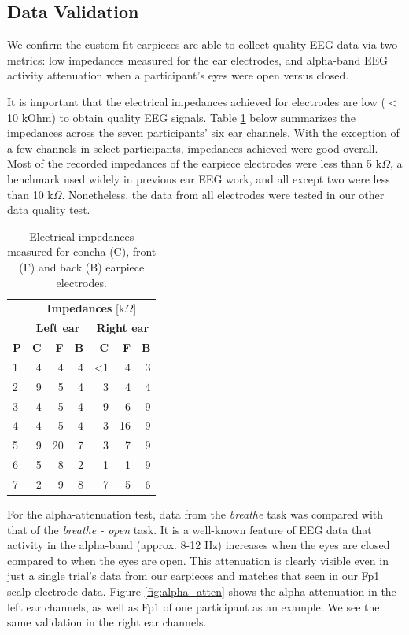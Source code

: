 \documentclass{sigchi}
\begin{document}
\subsection{Data Validation}

We confirm the custom-fit earpieces are able to collect quality EEG data via two metrics: low impedances measured for the ear electrodes, and alpha-band EEG activity attenuation when a participant's eyes were open versus closed.

It is important that the electrical impedances achieved for electrodes are low ($<$10 kOhm) to obtain quality EEG signals. Table \ref{tab:impedances} below summarizes the impedances across the seven participants' six ear channels. With the exception of a few channels in select participants, impedances achieved were good overall. Most of the recorded impedances of the earpiece electrodes were less than 5 k\(\Omega\), a benchmark used widely in previous ear EEG work, and all except two were less than 10 k\(\Omega\). Nonetheless, the data from all electrodes were tested in our other data quality test.

\begin{table}[h]
\begin{center}
\begin{tabular}{lrrrrrr}
& \multicolumn{6}{c}{\textbf{Impedances} [k\(\Omega\)]} \\
\cline{2-7}
& \multicolumn{3}{|c|}{\textbf{Left ear}} & \multicolumn{3}{c|}{\textbf{Right ear}} \\
\textbf{P} & \textbf{C} & \textbf{F} & \textbf{B} & \textbf{C} & \textbf{F} & \textbf{B} \\
\hline
1 & 4 & 4 & 4 & \textless1 & 4 & 3\\
2 & 9 & 5 & 4 & 3 & 4 & 4\\
3 & 4 & 5 & 4 & 9 & 6 & 9\\
4 & 4 & 5 & 4 & 3 & 16 & 9\\
5 & 9 & 20 & 7 & 3 & 7 & 9\\
6 & 5 & 8 & 2 & 1 & 1 & 9\\
7 & 2 & 9 & 8 & 7 & 5 & 6\\
\end{tabular}
\end{center}
\caption{Electrical impedances measured for concha (C), front (F) and back (B) earpiece electrodes.}
\label{tab:impedances}
\end{table}

For the alpha-attenuation test, data from the \textit{breathe} task was compared with that of the \textit{breathe - open} task. It is a well-known feature of EEG data that activity in the alpha-band (approx. 8-12 Hz) increases when the eyes are closed compared to when the eyes are open. This attenuation is clearly visible even in just a single trial's data from our earpieces and matches that seen in our Fp1 scalp electrode data. Figure \ref{fig:alpha_atten} shows the alpha attenuation in the left ear channels, as well as Fp1 of one participant as an example. We see the same validation in the right ear channels.
\end{document}
